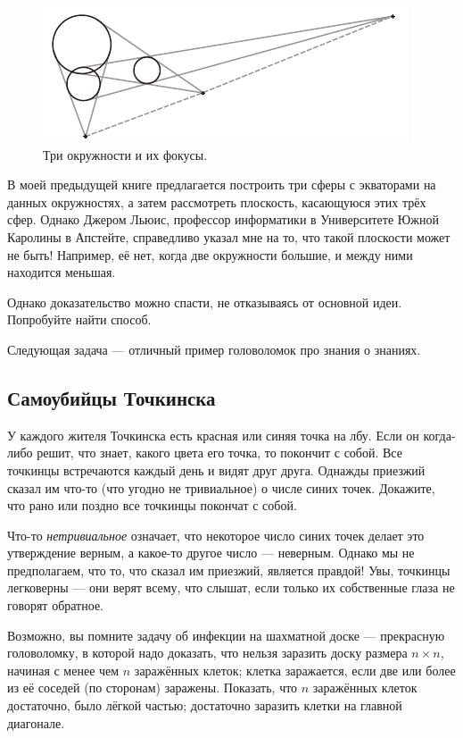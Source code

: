 \begin{figure}[h!]
\centering
\includegraphics[scale=1]{pics/3circs}
\caption{Три окружности и их фокусы.}
\label{pic:3circ}
\end{figure}

В моей предыдущей книге \cite{59} предлагается построить три сферы с экваторами на данных окружностях, а затем рассмотреть плоскость, касающуюся этих трёх сфер.
Однако Джером Льюис, профессор информатики в Университете Южной Каролины в Апстейте, справедливо указал мне на то, что такой плоскости может не быть!
Например, её нет, когда две окружности большие, и между ними находится меньшая.

Однако доказательство можно спасти, не отказываясь от основной идеи.
Попробуйте найти способ.

\medskip

Следующая задача --- отличный пример головоломок про знания о знаниях.

\subsection*{Самоубийцы Точкинска}

У каждого жителя Точкинска есть красная или синяя точка на лбу.
Если он когда-либо решит, что знает, какого цвета его точка, то покончит с собой.
Все точкинцы встречаются каждый день и видят друг друга.
Однажды приезжий сказал им что-то (что угодно не тривиальное) о числе синих точек.
Докажите, что рано или поздно все точкинцы покончат с собой.

 Что-то \emph{нетривиальное} означает, что некоторое число синих точек делает это утверждение верным, а какое-то другое число --- неверным.
Однако мы не предполагаем, что то, что сказал им приезжий, является правдой!
Увы, точкинцы легковерны --- они верят всему, что слышат, если только их собственные глаза не говорят обратное.

\medskip

Возможно, вы помните задачу об инфекции на шахматной доске --- прекрасную головоломку, в которой надо доказать, что нельзя заразить доску размера $n \times n$, начиная с менее чем $n$ заражённых клеток;
клетка заражается, если две или более из её соседей (по сторонам) заражены.
Показать, что $n$ заражённых клеток достаточно, было лёгкой частью; достаточно заразить клетки на главной диагонале.

